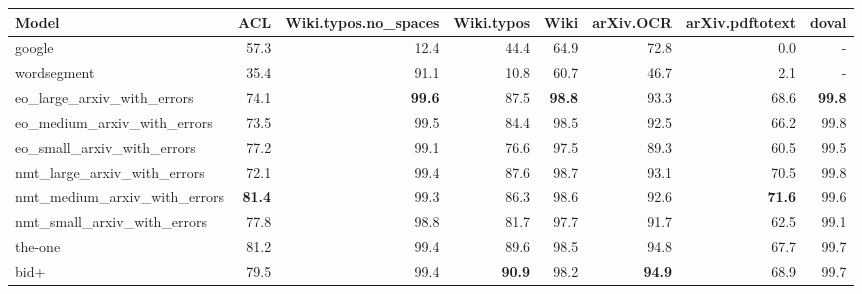 \begin{tabular}{lrrrrrrr} \hline
Model & ACL & Wiki.typos.no\_spaces & Wiki.typos & Wiki & arXiv.OCR & arXiv.pdftotext & doval \\ \hline
google & 57.3 & 12.4 & 44.4 & 64.9 & 72.8 & 0.0 & - \\ 
wordsegment & 35.4 & 91.1 & 10.8 & 60.7 & 46.7 & 2.1 & - \\ \hline
eo\_large\_arxiv\_with\_errors & 74.1 & \textbf{99.6} & 87.5 & \textbf{98.8} & 93.3 & 68.6 & \textbf{99.8} \\ 
eo\_medium\_arxiv\_with\_errors & 73.5 & 99.5 & 84.4 & 98.5 & 92.5 & 66.2 & 99.8 \\ 
eo\_small\_arxiv\_with\_errors & 77.2 & 99.1 & 76.6 & 97.5 & 89.3 & 60.5 & 99.5 \\ \hline
nmt\_large\_arxiv\_with\_errors & 72.1 & 99.4 & 87.6 & 98.7 & 93.1 & 70.5 & 99.8 \\ 
nmt\_medium\_arxiv\_with\_errors & \textbf{81.4} & 99.3 & 86.3 & 98.6 & 92.6 & \textbf{71.6} & 99.6 \\ 
nmt\_small\_arxiv\_with\_errors & 77.8 & 98.8 & 81.7 & 97.7 & 91.7 & 62.5 & 99.1 \\ \hline
the-one & 81.2 & 99.4 & 89.6 & 98.5 & 94.8 & 67.7 & 99.7 \\ 
bid+ & 79.5 & 99.4 & \textbf{90.9} & 98.2 & \textbf{94.9} & 68.9 & 99.7 \\ \hline
\end{tabular}